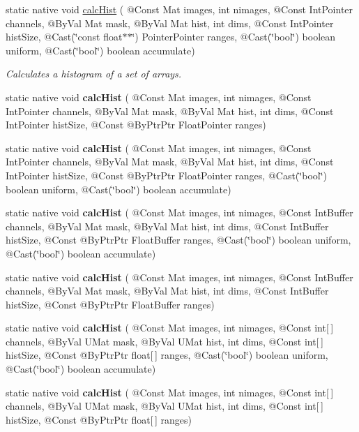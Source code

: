 \begin{DoxyCompactItemize}
static native void \hyperlink{group__imgproc__hist_ga5d3d264cae4eeaf1ffac100661154b5a}{calc\+Hist} ( @Const Mat images, int nimages, @Const Int\+Pointer channels, @By\+Val Mat mask, @By\+Val Mat hist, int dims, @Const Int\+Pointer hist\+Size, @Cast(\char`\"{}const float$\ast$$\ast$\char`\"{}) Pointer\+Pointer ranges, @Cast(\char`\"{}bool\char`\"{}) boolean uniform, @Cast(\char`\"{}bool\char`\"{}) boolean accumulate)
\begin{DoxyCompactList}\small\item\em Calculates a histogram of a set of arrays. \end{DoxyCompactList}\item 
static native void {\bfseries calc\+Hist} ( @Const Mat images, int nimages, @Const Int\+Pointer channels, @By\+Val Mat mask, @By\+Val Mat hist, int dims, @Const Int\+Pointer hist\+Size, @Const @By\+Ptr\+Ptr Float\+Pointer ranges)
\item 
static native void {\bfseries calc\+Hist} ( @Const Mat images, int nimages, @Const Int\+Pointer channels, @By\+Val Mat mask, @By\+Val Mat hist, int dims, @Const Int\+Pointer hist\+Size, @Const @By\+Ptr\+Ptr Float\+Pointer ranges, @Cast(\char`\"{}bool\char`\"{}) boolean uniform, @Cast(\char`\"{}bool\char`\"{}) boolean accumulate)
\item 
static native void {\bfseries calc\+Hist} ( @Const Mat images, int nimages, @Const Int\+Buffer channels, @By\+Val Mat mask, @By\+Val Mat hist, int dims, @Const Int\+Buffer hist\+Size, @Const @By\+Ptr\+Ptr Float\+Buffer ranges, @Cast(\char`\"{}bool\char`\"{}) boolean uniform, @Cast(\char`\"{}bool\char`\"{}) boolean accumulate)
\item 
static native void {\bfseries calc\+Hist} ( @Const Mat images, int nimages, @Const Int\+Buffer channels, @By\+Val Mat mask, @By\+Val Mat hist, int dims, @Const Int\+Buffer hist\+Size, @Const @By\+Ptr\+Ptr Float\+Buffer ranges)
\item 
static native void {\bfseries calc\+Hist} ( @Const Mat images, int nimages, @Const int\mbox{[}$\,$\mbox{]} channels, @By\+Val U\+Mat mask, @By\+Val U\+Mat hist, int dims, @Const int\mbox{[}$\,$\mbox{]} hist\+Size, @Const @By\+Ptr\+Ptr float\mbox{[}$\,$\mbox{]} ranges, @Cast(\char`\"{}bool\char`\"{}) boolean uniform, @Cast(\char`\"{}bool\char`\"{}) boolean accumulate)
\item 
static native void {\bfseries calc\+Hist} ( @Const Mat images, int nimages, @Const int\mbox{[}$\,$\mbox{]} channels, @By\+Val U\+Mat mask, @By\+Val U\+Mat hist, int dims, @Const int\mbox{[}$\,$\mbox{]} hist\+Size, @Const @By\+Ptr\+Ptr float\mbox{[}$\,$\mbox{]} ranges)
$$
\end{DoxyCompactItemize}
